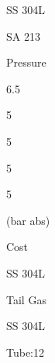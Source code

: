 \documentclass[a4paper,portrait,12pt]{article}
\begin{document}
\begin{flushleft}
SS 304L
\end{flushleft}





\begin{flushleft}
SA 213
\end{flushleft}





\begin{flushleft}
Pressure
\end{flushleft}





6.5





5





5





5





5





\begin{flushleft}
(bar abs)
\end{flushleft}


\begin{flushleft}
Cost
\end{flushleft}





\begin{flushleft}
SS 304L
\end{flushleft}





\begin{flushleft}
Tail Gas
\end{flushleft}





\begin{flushleft}
SS 304L
\end{flushleft}


\begin{flushleft}
Tube:12
\end{flushleft}
\end{document}
